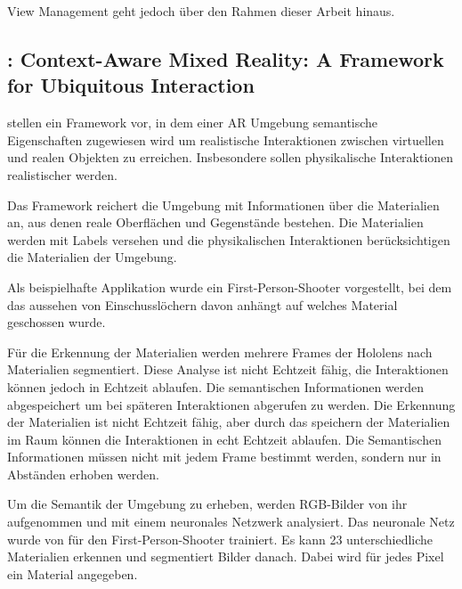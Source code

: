 View Management geht jedoch über den Rahmen dieser Arbeit hinaus.\citep{viewmanagement3d}


\subsection{\cite{contextawaremixedreality}: Context-Aware Mixed Reality: A Framework for Ubiquitous Interaction}

\cite{contextawaremixedreality} stellen ein Framework vor, in dem einer AR Umgebung semantische Eigenschaften zugewiesen wird um realistische Interaktionen zwischen virtuellen und realen Objekten zu erreichen. 
Insbesondere sollen physikalische Interaktionen realistischer werden.

Das Framework reichert die Umgebung mit Informationen über die Materialien an, aus denen reale Oberflächen und Gegenstände bestehen. Die Materialien werden mit Labels versehen und die physikalischen Interaktionen berücksichtigen die Materialien der Umgebung.

Als beispielhafte Applikation wurde ein First-Person-Shooter vorgestellt, bei dem das aussehen von Einschusslöchern davon anhängt auf welches Material geschossen wurde.

Für die Erkennung der Materialien werden mehrere Frames der Hololens nach Materialien segmentiert. Diese Analyse ist nicht Echtzeit fähig, die Interaktionen können jedoch in Echtzeit ablaufen. 
Die semantischen Informationen werden abgespeichert um bei späteren Interaktionen abgerufen zu werden. Die Erkennung der Materialien ist nicht Echtzeit fähig, aber durch das speichern der Materialien im Raum können die Interaktionen in echt Echtzeit ablaufen. Die Semantischen Informationen müssen nicht mit jedem Frame bestimmt werden, sondern nur in Abständen erhoben werden. 

Um die Semantik der Umgebung zu erheben, werden RGB-Bilder von ihr aufgenommen und mit einem neuronales Netzwerk analysiert. Das neuronale Netz wurde von \cite{contextawaremixedreality} für den First-Person-Shooter trainiert. Es kann 23 unterschiedliche Materialien erkennen und segmentiert Bilder danach. Dabei wird für jedes Pixel ein Material angegeben.

